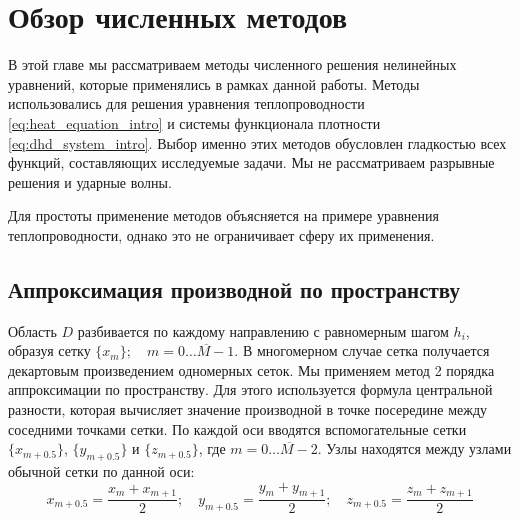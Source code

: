 \section{Обзор численных методов \label{methods}}
В этой главе мы рассматриваем методы численного решения нелинейных уравнений, которые применялись в рамках данной работы. Методы использовались для решения уравнения теплопроводности \eqref{eq:heat_equation_intro} и системы функционала плотности \eqref{eq:dhd_system_intro}. Выбор именно этих методов обусловлен гладкостью всех функций, составляющих исследуемые задачи. Мы не рассматриваем разрывные решения и ударные волны.
\par 
Для простоты применение методов объясняется на примере уравнения теплопроводности, однако это не ограничивает сферу их применения.
\subsection{Аппроксимация производной по пространству \label{methods:space_derivative}}
Область $D$ разбивается по каждому направлению с равномерным шагом $h_i$, образуя сетку $\{x_m\}; \quad m = \overline{0 \dots M-1}$. В многомерном случае сетка получается декартовым произведением одномерных сеток. Мы применяем метод 2 порядка аппроксимации по пространству.  Для этого используется формула центральной разности, которая вычисляет значение производной в точке посередине между соседними точками сетки. По каждой оси вводятся вспомогательные сетки $\{ x_{m+0.5}\}$,  $\{ y_{m+0.5}\}$ и  $\{ z_{m+0.5}\}$, где $m = \overline{0 \dots M-2}$. Узлы находятся между узлами обычной сетки по данной оси:
\begin{equation}
x_{m + 0.5} = \frac{x_m + x_{m+1}}{2};
\quad
y_{m + 0.5} = \frac{y_m + y_{m+1}}{2};
\quad
z_{m + 0.5} = \frac{z_m + z_{m+1}}{2}
\end{equation}

